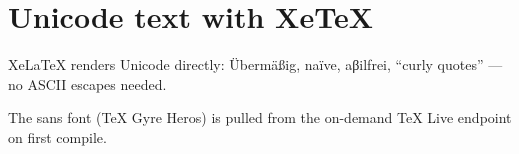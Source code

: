 \documentclass{article}
\begin{document}
\section{Unicode text with XeTeX}
Xe\LaTeX{} renders Unicode directly: Übermäßig, naïve, aβilfrei,
“curly quotes” --- no ASCII escapes needed.

\textsf{The sans font (TeX Gyre Heros) is pulled from the on-demand
TeX Live endpoint on first compile.}
\end{document}
